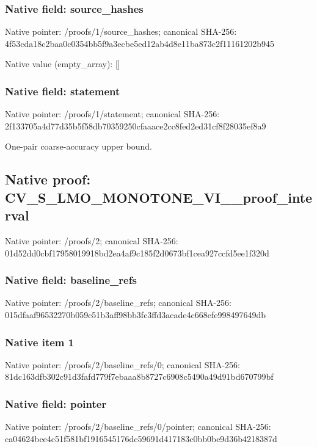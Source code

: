 \documentclass[10pt,a4paper]{article}
\begin{document}
\subsubsection{Native field: source\_\allowbreak{}hashes}
Native pointer: /proofs/1/source\_\allowbreak{}hashes; canonical SHA-256: 4f53cda18c2baa0c0354bb5f9a3ecbe5ed12ab4d8e11ba873c2f11161202b945

Native value (empty\_\allowbreak{}array): []

\subsubsection{Native field: statement}
Native pointer: /proofs/1/statement; canonical SHA-256: 2f133705a4d77d35b5f58db70359250cfaaace2cc8fed2ed31cf8f28035ef8a9

\begingroup\raggedright\sloppy One-pair coarse-accuracy upper bound.\par\endgroup

\subsection{Native proof: CV\_\allowbreak{}S\_\allowbreak{}LMO\_\allowbreak{}MONOTONE\_\allowbreak{}VI\_\allowbreak{}\_\allowbreak{}proof\_\allowbreak{}interval}
Native pointer: /proofs/2; canonical SHA-256: 01d52dd0cbf17958019918bd2ea4af9c185f2d0673bf1cea927ccfd5ee1f320d

\subsubsection{Native field: baseline\_\allowbreak{}refs}
Native pointer: /proofs/2/baseline\_\allowbreak{}refs; canonical SHA-256: 015dfaaf96532270b059c51b3aff98bb3fc3ffd3acade4c668efe998497649db

\subsubsection{Native item 1}
Native pointer: /proofs/2/baseline\_\allowbreak{}refs/0; canonical SHA-256: 81dc163dfb302c91d3fafd779f7ebaaa8b8727c6908c5490a49d91bd670799bf

\subsubsection{Native field: pointer}
Native pointer: /proofs/2/baseline\_\allowbreak{}refs/0/pointer; canonical SHA-256: ca04624bce4c51f581bf1916545176dc59691d417183c0bb0be9d36b4218387d
\end{document}
